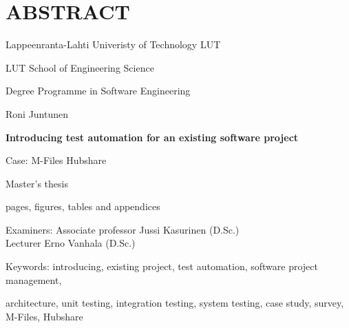 \chapter*{ABSTRACT}

Lappeenranta-Lahti Univeristy of Technology LUT

LUT School of Engineering Science

Degree Programme in Software Engineering

\hspace{1em}

Roni Juntunen

\hspace{1em}

\textbf{Introducing test automation for an existing software project}

Case: M-Files Hubshare

\hspace{1em}

Master’s thesis

\the\year{}

 pages,   figures,  tables and  appendices

\begin{flushleft}
	Examiners: Associate professor Jussi Kasurinen (D.Sc.)\\
\hspace{19.5mm} Lecturer Erno Vanhala (D.Sc.)\\
\end{flushleft}

Keywords: introducing, existing project, test automation, software project management,

\vspace{-8pt}
\leftskip=19.5mm architecture, unit testing, integration testing, system testing, case study, survey, M-Files, Hubshare\\

\leftskip=0pt

\hspace{1em}

